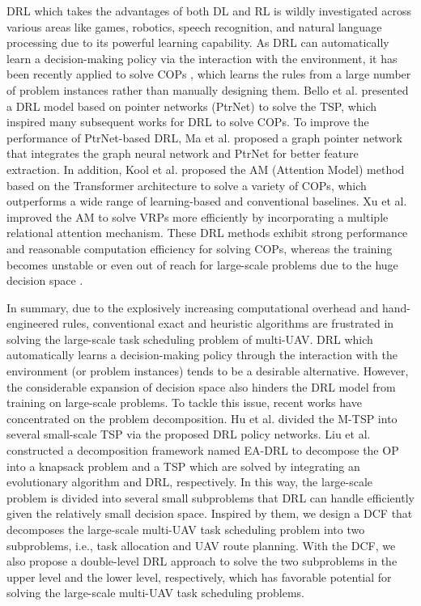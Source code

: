 \documentclass[lettersize,journal]{IEEEtran}
\begin{document}
	DRL which takes the advantages of both DL and RL is wildly investigated across various areas like games, robotics, speech recognition, and natural language processing \cite{guptaDeepReinforcementLearning2021} due to its powerful learning capability. As DRL can automatically learn a decision-making policy via the interaction with the environment, it has been recently applied to solve COPs \cite{luo2021real, wangHierarchicalReinforcementLearning2021}, which learns the rules from a large number of problem instances rather than manually designing them. Bello et al. \cite{belloNeuralCombinatorialOptimization2017} presented a DRL model based on pointer networks (PtrNet) \cite{vinyalsPointerNetworks2015} to solve the TSP, which inspired many subsequent works for DRL to solve COPs. To improve the performance of PtrNet-based DRL, Ma et al. \cite{maCombinatorialOptimizationGraph2019a} proposed a graph pointer network that integrates the graph neural network and PtrNet for better feature extraction. In addition, Kool et al. \cite{koolATTENTIONLEARNSOLVE2019a} proposed the AM (Attention Model) method based on the Transformer architecture \cite{vaswaniAttentionAllYou2017} to solve a variety of COPs, which outperforms a wide range of learning-based and conventional baselines. Xu et al. \cite{xuReinforcementLearningMultiple2022} improved the AM to solve VRPs more efficiently by incorporating a multiple relational attention mechanism. These DRL methods exhibit strong performance and reasonable computation efficiency for solving COPs, whereas the training becomes unstable or even out of reach for large-scale problems due to the huge decision space \cite{maHierarchicalReinforcementLearning2021}.
	
	In summary, due to the explosively increasing computational overhead and hand-engineered rules, conventional exact and heuristic algorithms are frustrated in solving the large-scale task scheduling problem of multi-UAV. DRL which automatically learns a decision-making policy through the interaction with the environment (or problem instances) tends to be a desirable alternative. However, the considerable expansion of decision space also hinders the DRL model from training on large-scale problems. To tackle this issue, recent works have concentrated on the problem decomposition. Hu et al. \cite{huReinforcementLearningApproach2020} divided the M-TSP into several small-scale TSP via the proposed DRL policy networks. Liu et al. \cite{liuDeepReinforcementLearning2022} constructed a decomposition framework named EA-DRL to decompose the OP into a knapsack problem and a TSP which are solved by integrating an evolutionary algorithm and DRL, respectively. In this way, the large-scale problem is divided into several small subproblems that DRL can handle efficiently given the relatively small decision space. Inspired by them, we design a DCF that decomposes the large-scale multi-UAV task scheduling problem into two subproblems, i.e., task allocation and UAV route planning. With the DCF, we also propose a double-level DRL approach to solve the two subproblems in the upper level and the lower level, respectively, which has favorable potential for solving the large-scale multi-UAV task scheduling problems.
	
\end{document}
